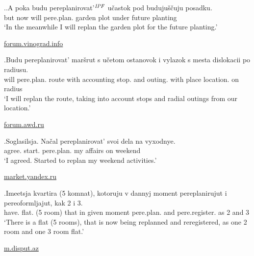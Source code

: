 \ex.\label{ex:pereplanirovat:imperf}\ag.\label{ex:pereplanirovat:future1}A poka budu pereplanirovat'$^{\mathit{IPF}}$ u\v{c}astok pod buduju\v{s}\v{c}uju posadku.\\
but now will pere.plan. {garden plot} under future planting\\
\vspace{0.5em}
`In the meanwhile I will replan the garden plot for the future planting.'
\begin{flushright}
\vspace{-0.5em}
\url{forum.vinograd.info}
\end{flushright}
\bg.\label{ex:pereplanirovat:future2}Budu pereplanirovat' mar\v{s}rut s u\v{c}etom ostanovok i vylazok s mesta dislokacii po radiusu.\\
will pere.plan. route with accounting stop. and outing. with place location. on radius\\
\vspace{0.5em}
`I will replan the route, taking into account stops and radial outings from our location.'
\begin{flushright}
\vspace{-0.5em}
\url{forum.awd.ru}
\end{flushright}
\bg.\label{ex:pereplanirovat:start}Soglasilsja. Na\v{c}al pereplanirovat' svoi dela na vyxodnye.\\
agree. start. pere.plan. my affairs on weekend\\
\vspace{0.5em}
`I agreed. Started to replan my weekend activities.'
\begin{flushright}
\vspace{-0.5em}
\url{market.yandex.ru}
\end{flushright}
\bg.\label{ex:pereplanirovat:prog}Imeetsja kvartira (5 komnat), kotoruju v dannyj moment pereplanirujut i pereoformljajut, kak 2 i 3.\\
have. flat. (5 room) that in given moment pere.plan. and pere.register. as 2 and 3\\
\vspace{0.5em}
`There is a flat (5 rooms), that is now being replanned and reregistered, as one 2 room and one 3 room flat.'
\begin{flushright}
\vspace{-0.5em}
\url{m.disput.az}
\end{flushright}
